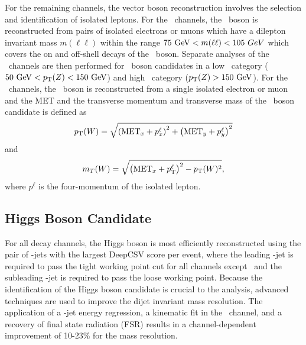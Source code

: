 For the remaining channels, the vector boson reconstruction involves the selection and identification of isolated leptons. For the \ZllH\ channels, the \bosZ\ boson is reconstructed from pairs of isolated electrons or muons which have a dilepton invariant mass $m(\ell\ell)$ within the range $75\ \mathrm{GeV} < m(\ell\ell) < 105\ GeV$ which covers the on and off-shell decays of the \bosZ\ boson. Separate analyses of the \ZllH\ channels are then performed for \bosZ\ boson candidates in a low \pT\ category ($50\ \mathrm{GeV} < p_{\mathrm{T}}(Z) < 150\ \mathrm{GeV}$) and high \pT\ category ($p_{\mathrm{T}}(Z) > 150\ \mathrm{GeV}$). For the \WlnH\ channels, the \bosW\ boson is reconstructed from a single isolated electron or muon and the MET and the transverse momentum and transverse mass of the \bosW\ boson candidate is defined as
\begin{equation}
  \pT(\bosW) = \sqrt{\left( \mathrm{MET}_{x} + p_{x}^{\ell} \right)^{2} + \left( \mathrm{MET}_{y} + p_{y}^{\ell} \right)^{2}}
  \label{eq:WlnWpT}
\end{equation}
and
\begin{equation}
  m_{T}(\bosW) = \sqrt{\left( \mathrm{MET}_{x} + p_{\mathrm{T}}^{\ell} \right)^{2} - \pT(\bosW)^{2}},
  \label{eq:WlnWmT}
\end{equation}
where $p^{\ell}$ is the four-momentum of the isolated lepton.

\subsection{Higgs Boson Candidate}

For all decay channels, the Higgs boson is most efficiently reconstructed using the pair of \qrkb-jets with the largest DeepCSV score per event, where the leading \qrkb-jet is required to pass the tight working point cut for all channels except \ZllH\ and the subleading \qrkb-jet is required to pass the loose working point. Because the identification of the Higgs boson candidate is crucial to the analysis, advanced techniques are used to improve the dijet invariant mass resolution. The application of a \qrkb-jet energy regression, a kinematic fit in the \ZllH\ channel, and a recovery of final state radiation (FSR) results in a channel-dependent improvement of 10-23\% for the mass resolution.

